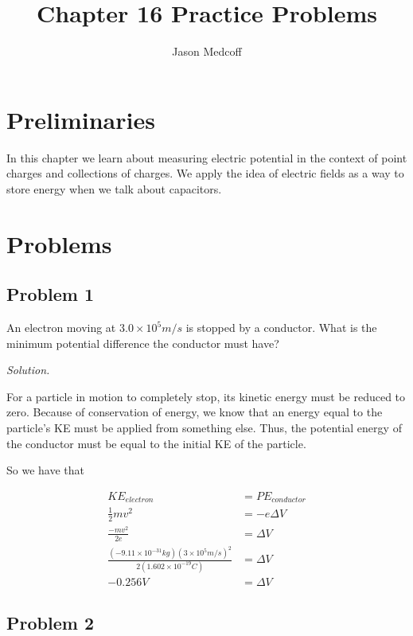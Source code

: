 \documentclass{article}
\title{Chapter 16 Practice Problems}
\author{Jason Medcoff}
\date{}
\begin{document}
	
	\maketitle
	
	\section{Preliminaries}
	In this chapter we learn about measuring electric potential in the context of point charges and collections of charges. We apply the idea of electric fields as a way to store energy when we talk about capacitors.
	
	\section{Problems}
	
	\subsection{Problem 1}
	
	An electron moving at $3.0 \times 10^5 m/s$ is stopped by a conductor. What is the minimum potential difference the conductor must have? 
	
	\textit{Solution.}
	
	For a particle in motion to completely stop, its kinetic energy must be reduced to zero. Because of conservation of energy, we know that an energy equal to the particle's KE must be applied from something else. Thus, the potential energy of the conductor must be equal to the initial KE of the particle.
	
	So we have that
	
	\begin{equation*}
	\begin{split}
	KE_{electron} & = PE_{conductor} \\
	\frac{1}{2}mv^2 & = -e \Delta V \\
	\frac{-mv^2}{2e} & = \Delta V \\
	\frac{(-9.11 \times 10^{-31} kg)(3 \times 10^5 m/s)^2}{2(1.602 \times 10^{-19} C)} & = \Delta V \\
	-0.256 V & = \Delta V
	\end{split}
	\end{equation*}
	
	\subsection{Problem 2}
	
\end{document}
